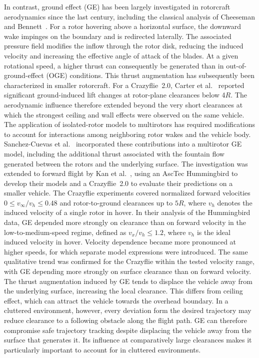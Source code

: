 \documentclass[journal]{IEEEtran}
\begin{document}
In contrast, ground effect (GE) has been largely investigated in rotorcraft aerodynamics since the last century, including the classical analysis of Cheeseman and Bennett~\cite{CheesemanBennett1955}. For a rotor hovering above a horizontal surface, the downward wake impinges on the boundary and is redirected laterally. The associated pressure field modifies the inflow through the rotor disk, reducing the induced velocity and increasing the effective angle of attack of the blades. At a given rotational speed, a higher thrust can consequently be generated than in out-of-ground-effect (OGE) conditions. This thrust augmentation has subsequently been characterized in smaller rotorcraft. For a Crazyflie~2.0, Carter et al.~\cite{Carter2021} reported significant ground-induced lift changes at rotor-plane clearances below 4$R$. The aerodynamic influence therefore extended beyond the very short clearances at which the strongest ceiling and wall effects were observed on the same vehicle.
The application of isolated-rotor models to multirotors has required modifications to account for interactions among neighboring rotor wakes and the vehicle body. Sanchez-Cuevas et al.~\cite{SanchezCuevas2017} incorporated these contributions into a multirotor GE model, including the additional thrust associated with the fountain flow generated between the rotors and the underlying surface.
The investigation was extended to forward flight by Kan et al.~\cite{Kan2019}, using an AscTec Hummingbird to develop their models and a Crazyflie~2.0 to evaluate their predictions on a smaller vehicle. The Crazyflie experiments covered normalized forward velocities \(0 \leq v_\infty/v_h \leq 0.48\) and rotor-to-ground clearances up to \(5R\), where \(v_h\) denotes the induced velocity of a single rotor in hover. In their analysis of the Hummingbird data, GE depended more strongly on clearance than on forward velocity in the low-to-medium-speed regime, defined as $v_x/v_h\leq1.2$, where $v_h$ is the ideal induced velocity in hover. Velocity dependence became more pronounced at higher speeds, for which separate model expressions were introduced. The same qualitative trend was confirmed for the Crazyflie within the tested velocity range, with GE depending more strongly on surface clearance than on forward velocity.
The thrust augmentation induced by GE tends to displace the vehicle away from the underlying surface, increasing the local clearance. This differs from ceiling effect, which can attract the vehicle towards the overhead boundary. In a cluttered environment, however, every deviation form the desired trajectory may reduce clearance to a following obstacle along the flight path. GE can therefore compromise safe trajectory tracking despite displacing the vehicle away from the surface that generates it. Its influence at comparatively large clearances makes it particularly important to account for in cluttered environments.
\end{document}
